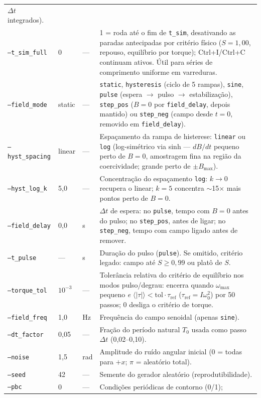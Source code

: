 \documentclass[11pt,a4paper]{article}
\newcommand{\code}[1]{\texttt{#1}}
\begin{document}
\begin{longtable}{@{}lll p{7.6cm}@{}}
$\Delta t$ integrados). \\
\code{--t\_sim\_full} & 0 & --- & 1 = roda até o fim de \code{t\_sim},
desativando as paradas antecipadas por critério físico ($S{=}1{,}00$,
repouso, equilíbrio por torque); Ctrl+I/Ctrl+C continuam ativos. Útil
para séries de comprimento uniforme em varreduras. \\
\code{--field\_mode} & static & --- & \code{static},
\code{hysteresis} (ciclo de 5 rampas), \code{sine}, \code{pulse}
(espera $\to$ pulso $\to$ estabilização), \code{step\_pos} ($B{=}0$ por
\code{field\_delay}, depois mantido) ou \code{step\_neg} (campo desde
$t{=}0$, removido em \code{field\_delay}). \\
\code{--hyst\_spacing} & linear & --- & Espaçamento da rampa de
histerese: \code{linear} ou \code{log} (log-simétrico via sinh ---
$dB/dt$ pequeno perto de $B{=}0$, amostragem fina na região da
coercividade; grande perto de $\pm B_{\max}$). \\
\code{--hyst\_log\_k} & 5{,}0 & --- & Concentração do espaçamento
\code{log}: $k \to 0$ recupera o linear; $k{=}5$ concentra
$\sim$15$\times$ mais pontos perto de $B{=}0$. \\
\code{--field\_delay} & 0{,}0 & s & $\Delta t$ de espera: no
\code{pulse}, tempo com $B{=}0$ antes do pulso; no \code{step\_pos},
antes de ligar; no \code{step\_neg}, tempo com campo ligado antes de
remover. \\
\code{--t\_pulse} & --- & s & Duração do pulso (\code{pulse}). Se
omitido, critério legado: campo até $S \geq 0{,}99$ ou platô de $S$. \\
\code{--torque\_tol} & $10^{-3}$ & --- & Tolerância relativa do critério
de equilíbrio nos modos pulso/degrau: encerra quando $\omega_{\max}$
pequeno \emph{e} $\langle|\tau|\rangle < \mathrm{tol}\cdot\tau_{\mathrm{ref}}$
($\tau_{\mathrm{ref}} = I\omega_0^2$) por 50 passos; 0 desliga o
critério de torque. \\
\code{--field\_freq} & 1{,}0 & Hz & Frequência do campo senoidal
(apenas \code{sine}). \\
\code{--dt\_factor} & 0{,}05 & --- & Fração do período natural $T_0$
usada como passo $\Delta t$ (0{,}02--0{,}10). \\
\code{--noise} & 1{,}5 & rad & Amplitude do ruído angular inicial
($0$ = todas para $+x$; $\pi$ = aleatório total). \\
\code{--seed} & 42 & --- & Semente do gerador aleatório
(reprodutibilidade). \\
\code{--pbc} & 0 & --- & Condições periódicas de contorno (0/1);

\end{longtable}
\end{document}
